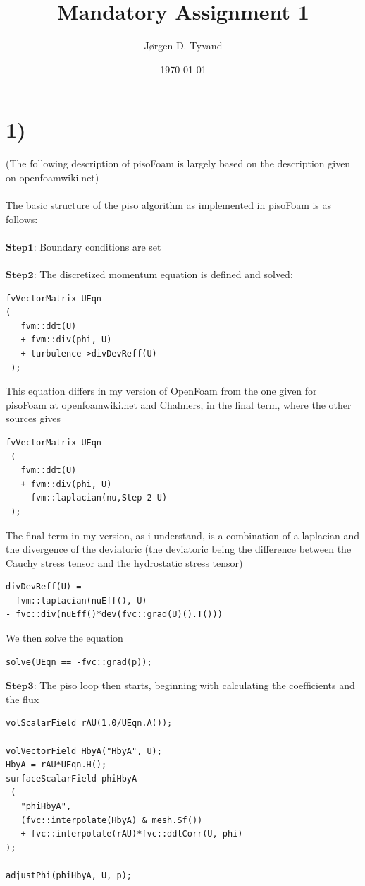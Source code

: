 \documentclass[a4paper,english,12pt,twoside]{article}
\date{\today}
\title{Mandatory Assignment 1}
\author{Jørgen D. Tyvand}
\begin{document}
\maketitle
\newpage

\section*{1)}
(The following description of pisoFoam is largely based on the description given on openfoamwiki.net)\\
\\
The basic structure of the piso algorithm as implemented in pisoFoam is as follows:\\
\\
$\mathbf{Step 1}$: Boundary conditions are set\\
\\
$\mathbf{Step 2}$: The discretized momentum equation is defined and solved:\\
\begin{lstlisting}[style=python]
fvVectorMatrix UEqn
(
   fvm::ddt(U)
   + fvm::div(phi, U)
   + turbulence->divDevReff(U)
 );
\end{lstlisting}
This equation differs in my version of OpenFoam from the one given for pisoFoam at openfoamwiki.net and Chalmers, in the final term, where the other sources gives\\
\begin{lstlisting}[style=python]
 fvVectorMatrix UEqn
 (
   fvm::ddt(U)
   + fvm::div(phi, U)
   - fvm::laplacian(nu,Step 2 U)
 );
\end{lstlisting}
The final term in my version, as i understand, is a combination of a laplacian and the divergence of the deviatoric  (the deviatoric being the difference between the Cauchy stress tensor and the hydrostatic stress tensor)
\begin{lstlisting}[style=python]
divDevReff(U) =
- fvm::laplacian(nuEff(), U)
- fvc::div(nuEff()*dev(fvc::grad(U)().T())) 
\end{lstlisting}
We then solve the equation
\begin{lstlisting}[style=python]
solve(UEqn == -fvc::grad(p));
\end{lstlisting}
\newpage
$\mathbf{Step 3}$: The piso loop then starts, beginning with calculating the coefficients and the flux
\begin{lstlisting}[style=python]
 volScalarField rAU(1.0/UEqn.A());

volVectorField HbyA("HbyA", U);
HbyA = rAU*UEqn.H();
surfaceScalarField phiHbyA
 (
   "phiHbyA",
   (fvc::interpolate(HbyA) & mesh.Sf())
   + fvc::interpolate(rAU)*fvc::ddtCorr(U, phi)
);

adjustPhi(phiHbyA, U, p);
\end{lstlisting}
\end{document}
